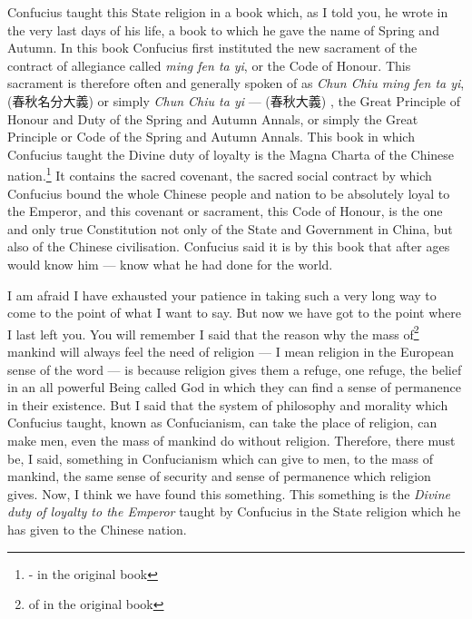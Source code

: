 Confucius taught this State religion in a book which, as I told you, he wrote in the very last days of his life, a book to which he gave the name of Spring and Autumn.
In this book Confucius first instituted the new sacrament of the contract of allegiance called \emph{ming fen ta yi}, or the Code of Honour.
This sacrament is therefore often and generally spoken of as \emph{Chun Chiu ming fen ta yi},  (春秋名分大義)  or simply \emph{Chun Chiu ta yi} --- (春秋大義) \ie, the Great Principle of Honour and Duty of the Spring and Autumn Annals, or simply the Great Principle or Code of the Spring and Autumn Annals.
This book in which Confucius taught the Divine duty of loyalty is the Magna Charta  of the Chinese nation.\footnote{- in the original book} It contains the sacred covenant, the sacred social contract by which Confucius bound the whole Chinese people and nation to be absolutely loyal to the Emperor, and this covenant or sacrament, this Code of Honour, is the one and only true Constitution not only of the State and Government in China, but also of the Chinese civilisation.
Confucius said it is by this book that after ages would know him --- know what he had done for the world.

\vspace{0.5cm}
I am afraid I have exhausted your patience in taking such a very long way to come to the point of what I want to say.
But now we have got to the point where I last left you.
You will remember I said that the reason why the mass of\footnote{of in the original book} mankind will always feel the need of religion --- I mean religion in the European sense of the word --- is because religion gives them a refuge, one refuge, the belief in an all powerful Being called God in which they can find a sense of permanence in their existence.
But I said that the system of philosophy and morality which Confucius taught, known as Confucianism, can take the place of religion, can make men, even the mass of mankind do without religion.
Therefore, there must be, I said, something in Confucianism which can give to men, to the mass of mankind, the same sense of security and sense of permanence which religion gives.
Now, I think we have found this something.
This something is the \emph{Divine duty of loyalty to the Emperor} taught by Confucius in the State religion which he has given to the Chinese nation.

